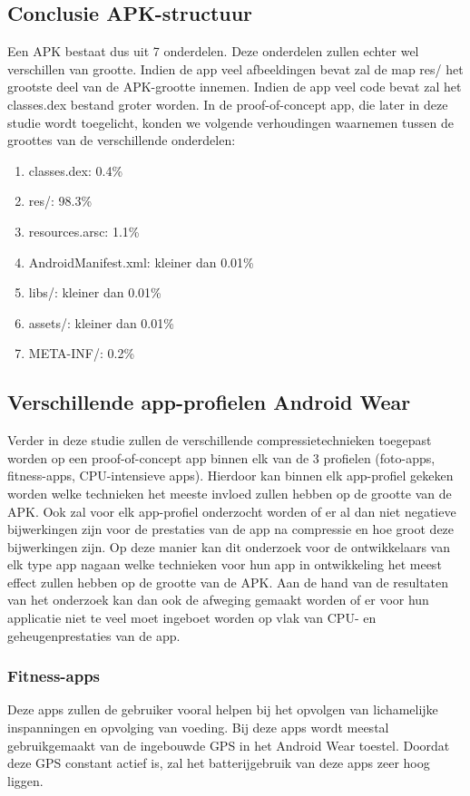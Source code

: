 \subsection{Conclusie APK-structuur}
Een APK bestaat dus uit 7 onderdelen. Deze onderdelen zullen echter wel verschillen van grootte. Indien de app veel afbeeldingen bevat zal de map res/ het grootste deel van de APK-grootte innemen. Indien de app veel code bevat zal het classes.dex bestand groter worden. In de proof-of-concept app, die later in deze studie wordt toegelicht, konden we volgende verhoudingen waarnemen tussen de groottes van de verschillende onderdelen: 
\begin{enumerate}
	\item classes.dex: 0.4\%
	\item res/: 98.3\%
	\item resources.arsc: 1.1\%
	\item AndroidManifest.xml: kleiner dan 0.01\%
	\item libs/: kleiner dan 0.01\%
	\item assets/: kleiner dan 0.01\%
	\item META-INF/: 0.2\% 
\end{enumerate}

\subsection{Verschillende app-profielen Android Wear}
Verder in deze studie zullen de verschillende compressietechnieken toegepast worden op een proof-of-concept app binnen elk van de 3 profielen (foto-apps, fitness-apps, CPU-intensieve apps). Hierdoor kan binnen elk app-profiel gekeken worden welke technieken het meeste invloed zullen hebben op de grootte van de APK. Ook zal voor elk app-profiel onderzocht worden of er al dan niet negatieve bijwerkingen zijn voor de prestaties van de app na compressie en hoe groot deze bijwerkingen zijn. Op deze manier kan dit onderzoek voor de ontwikkelaars van elk type app nagaan welke technieken voor hun app in ontwikkeling het meest effect zullen hebben op de grootte van de APK. Aan de hand van de resultaten van het onderzoek kan dan ook de afweging gemaakt worden of er voor hun applicatie niet te veel moet ingeboet worden op vlak van CPU- en geheugenprestaties van de app.
\subsubsection{Fitness-apps}
Deze apps zullen de gebruiker vooral helpen bij het opvolgen van lichamelijke inspanningen en opvolging van voeding. Bij deze apps wordt meestal gebruikgemaakt van de ingebouwde GPS in het Android Wear toestel. Doordat deze GPS constant actief is, zal het batterijgebruik van deze apps zeer hoog liggen.
